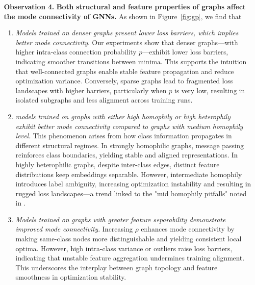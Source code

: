 \noindent\textbf{Observation 4.} \textbf{Both structural and feature properties of graphs affect the mode connectivity of GNNs.} As shown in Figure~\ref{fig:gp}, we find that 
\begin{enumerate}[nosep, leftmargin=20pt]
    \item \textit{Models trained on denser graphs present lower loss barriers, which implies better mode connectivity}.  Our experiments show that denser graphs—with higher intra-class connection probability \( p \)—exhibit lower loss barriers, indicating smoother transitions between minima. This supports the intuition that well-connected graphs enable stable feature propagation and reduce optimization variance. Conversely, sparse graphs lead to fragmented loss landscapes with higher barriers, particularly when \( p \) is very low, resulting in isolated subgraphs and less alignment across training runs.
    \item \textit{models trained on graphs with either high homophily or high heterophily exhibit better mode connectivity compared to graphs with medium homophily level.} This phenomenon arises from how class information propagates in different structural regimes. In strongly homophilic graphs, message passing reinforces class boundaries, yielding stable and aligned representations. In highly heterophilic graphs, despite inter-class edges, distinct feature distributions keep embeddings separable. However, intermediate homophily introduces label ambiguity, increasing optimization instability and resulting in rugged loss landscapes—a trend linked to the "mid homophily pitfalls" noted in \citet{luan2023graph}.
    \item \textit{Models trained on graphs with greater feature separability demonstrate improved mode connectivity.} Increasing \( \rho \) enhances mode connectivity by making same-class nodes more distinguishable and yielding consistent local optima. However, high intra-class variance or outliers raise loss barriers, indicating that unstable feature aggregation undermines training alignment. This underscores the interplay between graph topology and feature smoothness in optimization stability.
\end{enumerate}


